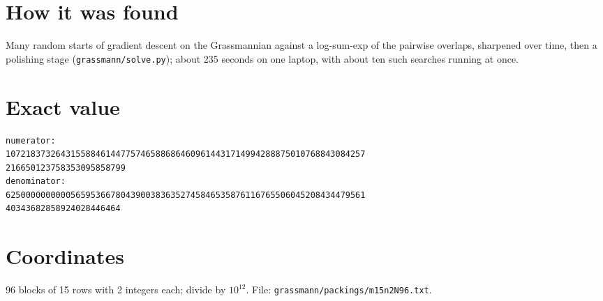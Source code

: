 \documentclass[11pt,a4paper]{article}
\begin{document}
\section{How it was found}
Many random starts of gradient descent on the Grassmannian against a log-sum-exp of the pairwise overlaps, sharpened over time, then a polishing stage (\texttt{grassmann/solve.py}); about 235 seconds on one laptop, with about ten such searches running at once.


\appendix
\section{Exact value}
{\small
\begin{verbatim}
numerator:
107218373264315588461447757465886864609614431714994288875010768843084257
216650123758353095858799
denominator:
625000000000056595366780439003836352745846535876116765506045208434479561
40343682858924028446464
\end{verbatim}}

\section{Coordinates}
96 blocks of 15 rows with 2 integers each; divide by $10^{12}$. File: \texttt{grassmann/packings/m15n2N96.txt}.
{\tiny
\begin{multicols}{4}
\end{multicols}}
\end{document}
